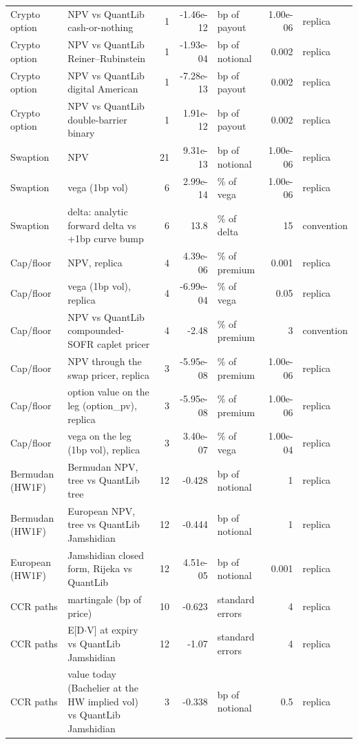 \documentclass[11pt,a4paper]{article}
\begin{document}
{\begin{longtable}{>{\raggedright\arraybackslash}p{2.2cm}>{\raggedright\arraybackslash}p{4.6cm} r r >{\raggedright\arraybackslash}p{1.8cm} r >{\raggedright\arraybackslash}p{1.8cm}}
Crypto option & NPV vs QuantLib cash-or-nothing & 1 & -1.46e-12 & bp of payout & 1.00e-06 & replica \\
Crypto option & NPV vs QuantLib Reiner–Rubinstein & 1 & -1.93e-04 & bp of notional & 0.002 & replica \\
Crypto option & NPV vs QuantLib digital American & 1 & -7.28e-13 & bp of payout & 0.002 & replica \\
Crypto option & NPV vs QuantLib double-barrier binary & 1 & 1.91e-12 & bp of payout & 0.002 & replica \\
Swaption & NPV & 21 & 9.31e-13 & bp of notional & 1.00e-06 & replica \\
Swaption & vega (1bp vol) & 6 & 2.99e-14 & \% of vega & 1.00e-06 & replica \\
Swaption & delta: analytic forward delta vs +1bp curve bump & 6 & 13.8 & \% of delta & 15 & convention \\
Cap/floor & NPV, replica & 4 & 4.39e-06 & \% of premium & 0.001 & replica \\
Cap/floor & vega (1bp vol), replica & 4 & -6.99e-04 & \% of vega & 0.05 & replica \\
Cap/floor & NPV vs QuantLib compounded-SOFR caplet pricer & 4 & -2.48 & \% of premium & 3 & convention \\
Cap/floor & NPV through the swap pricer, replica & 3 & -5.95e-08 & \% of premium & 1.00e-06 & replica \\
Cap/floor & option value on the leg (option\_pv), replica & 3 & -5.95e-08 & \% of premium & 1.00e-06 & replica \\
Cap/floor & vega on the leg (1bp vol), replica & 3 & 3.40e-07 & \% of vega & 1.00e-04 & replica \\
Bermudan (HW1F) & Bermudan NPV, tree vs QuantLib tree & 12 & -0.428 & bp of notional & 1 & replica \\
Bermudan (HW1F) & European NPV, tree vs QuantLib Jamshidian & 12 & -0.444 & bp of notional & 1 & replica \\
European (HW1F) & Jamshidian closed form, Rijeka vs QuantLib & 12 & 4.51e-05 & bp of notional & 0.001 & replica \\
CCR paths & martingale (bp of price) & 10 & -0.623 & standard errors & 4 & replica \\
CCR paths & E[D$\cdot$V] at expiry vs QuantLib Jamshidian & 12 & -1.07 & standard errors & 4 & replica \\
CCR paths & value today (Bachelier at the HW implied vol) vs QuantLib Jamshidian & 3 & -0.338 & bp of notional & 0.5 & replica \\

\end{longtable}}
\end{document}
